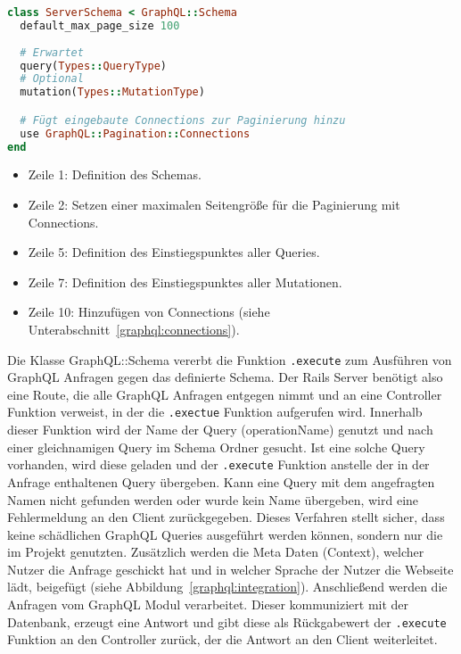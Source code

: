 \begin{lstlisting}[language=Ruby,float=h!,caption={graphql-ruby Schema Definition und Festlegung der Einstiegpunkte query und mutation}, label={lst:graphql:schema}]
class ServerSchema < GraphQL::Schema
  default_max_page_size 100
  
  # Erwartet
  query(Types::QueryType)
  # Optional
  mutation(Types::MutationType)

  # Fügt eingebaute Connections zur Paginierung hinzu
  use GraphQL::Pagination::Connections
end
\end{lstlisting}

\begin{itemize}
	\setlength\itemsep{-1em}
	\item Zeile 1: Definition des Schemas.
	\item Zeile 2: Setzen einer maximalen Seitengröße für die Paginierung mit Connections.
	\item Zeile 5: Definition des Einstiegspunktes aller Queries.
	\item Zeile 7: Definition des Einstiegspunktes aller Mutationen.
	\item Zeile 10: Hinzufügen von Connections (siehe Unterabschnitt~\ref{graphql:connections}).
\end{itemize}

Die Klasse GraphQL::Schema vererbt die Funktion \texttt{.execute} zum Ausführen von GraphQL Anfragen gegen das definierte Schema. Der Rails Server benötigt also eine Route, die alle GraphQL Anfragen entgegen nimmt und an eine Controller Funktion verweist, in der die \texttt{.exectue} Funktion aufgerufen wird. Innerhalb dieser Funktion wird der Name der Query (operationName) genutzt und nach einer gleichnamigen Query im Schema Ordner gesucht. Ist eine solche Query vorhanden, wird diese geladen und der \texttt{.execute} Funktion anstelle der in der Anfrage enthaltenen Query übergeben.
Kann eine Query mit dem angefragten Namen nicht gefunden werden oder wurde kein Name übergeben, wird eine Fehlermeldung an den Client zurückgegeben. Dieses Verfahren stellt sicher, dass keine schädlichen GraphQL Queries ausgeführt werden können, sondern nur die im Projekt genutzten.
Zusätzlich werden die Meta Daten (Context), welcher Nutzer die Anfrage geschickt hat und in welcher Sprache der Nutzer die Webseite lädt, beigefügt (siehe Abbildung~\ref{graphql:integration}). Anschließend werden die Anfragen vom GraphQL Modul verarbeitet. Dieser kommuniziert mit der Datenbank, erzeugt eine Antwort und gibt diese als Rückgabewert der \texttt{.execute} Funktion an den Controller zurück, der die Antwort an den Client weiterleitet.

